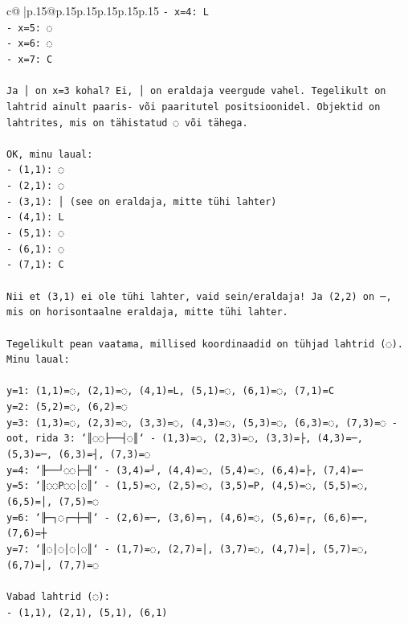 \documentclass{article}
\begin{document}
{\begin{supertabular}{c@{$\;$}|p{.15\linewidth}@{}p{.15\linewidth}p{.15\linewidth}p{.15\linewidth}p{.15\linewidth}p{.15\linewidth}}
{{{\texttt{{-} x=4: L} \\
\texttt{{-} x=5: ◌} \\
\texttt{{-} x=6: ◌} \\
\texttt{{-} x=7: C} \\
\\ 
\texttt{Ja │ on x=3 kohal? Ei, │ on eraldaja veergude vahel. Tegelikult on lahtrid ainult paaris{-} või paaritutel positsioonidel. Objektid on lahtrites, mis on tähistatud ◌ või tähega.} \\
\\ 
\texttt{OK, minu laual:} \\
\texttt{{-} (1,1): ◌} \\
\texttt{{-} (2,1): ◌} \\
\texttt{{-} (3,1): │ (see on eraldaja, mitte tühi lahter)} \\
\texttt{{-} (4,1): L} \\
\texttt{{-} (5,1): ◌} \\
\texttt{{-} (6,1): ◌} \\
\texttt{{-} (7,1): C} \\
\\ 
\texttt{Nii et (3,1) ei ole tühi lahter, vaid sein/eraldaja! Ja (2,2) on ─, mis on horisontaalne eraldaja, mitte tühi lahter.} \\
\\ 
\texttt{Tegelikult pean vaatama, millised koordinaadid on tühjad lahtrid (◌). Minu laual:} \\
\\ 
\texttt{y=1: (1,1)=◌, (2,1)=◌, (4,1)=L, (5,1)=◌, (6,1)=◌, (7,1)=C} \\
\texttt{y=2: (5,2)=◌, (6,2)=◌} \\
\texttt{y=3: (1,3)=◌, (2,3)=◌, (3,3)=◌, (4,3)=◌, (5,3)=◌, (6,3)=◌, (7,3)=◌ {-} oot, rida 3: `║◌◌├──┤◌║` {-} (1,3)=◌, (2,3)=◌, (3,3)=├, (4,3)=─, (5,3)=─, (6,3)=┤, (7,3)=◌} \\
\texttt{y=4: `╟──┘◌◌├─╢` {-} (3,4)=┘, (4,4)=◌, (5,4)=◌, (6,4)=├, (7,4)=─} \\
\texttt{y=5: `║◌◌P◌◌│◌║` {-} (1,5)=◌, (2,5)=◌, (3,5)=P, (4,5)=◌, (5,5)=◌, (6,5)=│, (7,5)=◌} \\
\texttt{y=6: `╟─┐◌┌─┼─╢` {-} (2,6)=─, (3,6)=┐, (4,6)=◌, (5,6)=┌, (6,6)=─, (7,6)=┼} \\
\texttt{y=7: `║◌│◌│◌│◌║` {-} (1,7)=◌, (2,7)=│, (3,7)=◌, (4,7)=│, (5,7)=◌, (6,7)=│, (7,7)=◌} \\
\\ 
\texttt{Vabad lahtrid (◌):} \\
\texttt{{-} (1,1), (2,1), (5,1), (6,1)} \\
}}}
\end{supertabular}}
\end{document}
